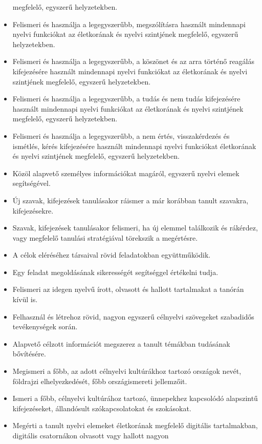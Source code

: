 \begin{itemize}
  megfelelő, egyszerű helyzetekben.
\item
  Felismeri és használja a legegyszerűbb, megszólításra használt
  mindennapi nyelvi funkciókat az életkorának és nyelvi szintjének
  megfelelő, egyszerű helyzetekben.
\item
  Felismeri és használja a legegyszerűbb, a köszönet és az arra történő
  reagálás kifejezésére használt mindennapi nyelvi funkciókat az
  életkorának és nyelvi szintjének megfelelő, egyszerű helyzetekben.
\item
  Felismeri és használja a legegyszerűbb, a tudás és nem tudás
  kifejezésére használt mindennapi nyelvi funkciókat az életkorának és
  nyelvi szintjének megfelelő, egyszerű helyzetekben.
\item
  Felismeri és használja a legegyszerűbb, a nem értés, visszakérdezés és
  ismétlés, kérés kifejezésére használt mindennapi nyelvi funkciókat
  életkorának és nyelvi szintjének megfelelő, egyszerű helyzetekben.
\item
  Közöl alapvető személyes információkat magáról, egyszerű nyelvi elemek
  segítségével.
\item
  Új szavak, kifejezések tanulásakor ráismer a már korábban tanult
  szavakra, kifejezésekre.
\item
  Szavak, kifejezések tanulásakor felismeri, ha új elemmel találkozik és
  rákérdez, vagy megfelelő tanulási stratégiával törekszik a megértésre.
\item
  A célok eléréséhez társaival rövid feladatokban együttműködik.
\item
  Egy feladat megoldásának sikerességét segítséggel értékelni tudja.
\item
  Felismeri az idegen nyelvű írott, olvasott és hallott tartalmakat a
  tanórán kívül is.
\item
  Felhasznál és létrehoz rövid, nagyon egyszerű célnyelvi szövegeket
  szabadidős tevékenységek során.
\item
  Alapvető célzott információt megszerez a tanult témákban tudásának
  bővítésére.
\item
  Megismeri a főbb, az adott célnyelvi kultúrákhoz tartozó országok
  nevét, földrajzi elhelyezkedését, főbb országismereti jellemzőit.
\item
  Ismeri a főbb, célnyelvi kultúrához tartozó, ünnepekhez kapcsolódó
  alapszintű kifejezéseket, állandósult szókapcsolatokat és szokásokat.
\item
  Megérti a tanult nyelvi elemeket életkorának megfelelő digitális
  tartalmakban, digitális csatornákon olvasott vagy hallott nagyon

\end{itemize}
